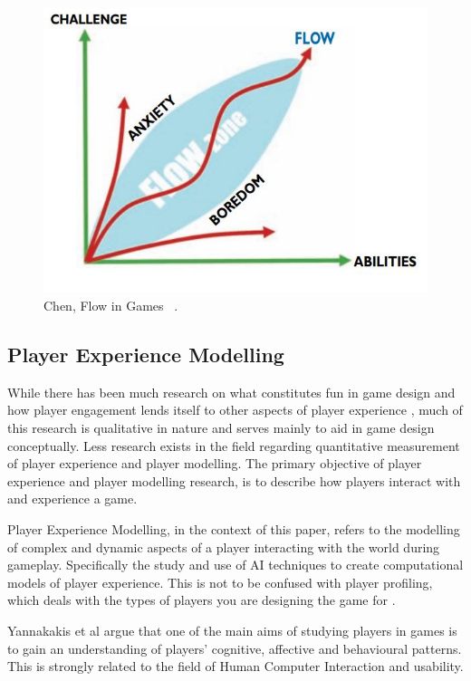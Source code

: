 \documentclass[journal]{IEEEtran}
\begin{document}
\begin{figure}[h]
	\includegraphics[width=1.0\linewidth]{FlowChart.jpg}
	\caption{Chen, Flow in Games ~\cite{Chen:2007:FG:1232743.1232769}.}
	\label{FlowChart}
\end{figure} 


\subsection{Player Experience Modelling}

While there has been much research on what constitutes fun in game design and how player engagement lends itself to other aspects of player experience \cite{salen2004rules} \cite{koster2013theory}, much of this research is qualitative in nature and serves mainly to aid in game design conceptually. Less research exists in the field regarding quantitative measurement of player experience and player modelling. The primary objective of player experience and player modelling research, is to describe how players interact with and experience a game. 

Player Experience Modelling, in the context of this paper, refers to the modelling of complex and dynamic aspects of a player interacting with the world during gameplay. Specifically the study and use of AI techniques to create computational models of player experience. This is not to be confused with player profiling, which deals with the types of players you are designing the game for \cite{bartle1996hearts}. 

Yannakakis et al \cite{yannakakis2013player} argue that one of the main aims of studying players in games is to gain an understanding of players' cognitive, affective and behavioural patterns. This is strongly related to the field of Human Computer Interaction \cite{preece1994human} \cite{fischer2001user} and usability. 
\end{document}

